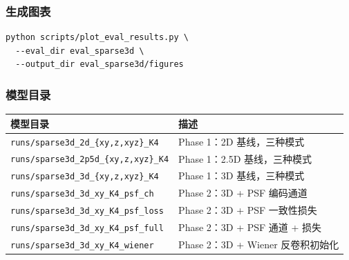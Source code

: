 \documentclass[UTF8, scheme=plain, 11pt, a4paper]{ctexart}
\begin{document}
\subsubsection*{生成图表}
\begin{verbatim}
python scripts/plot_eval_results.py \
  --eval_dir eval_sparse3d \
  --output_dir eval_sparse3d/figures
\end{verbatim}

\subsubsection*{模型目录}
\begin{table}[H]
  \small
  \centering
  \begin{tabular}{ll}
    \toprule
    模型目录 & 描述 \\
    \midrule
    \texttt{runs/sparse3d\_2d\_\{xy,z,xyz\}\_K4} & Phase 1：2D 基线，三种模式 \\
    \texttt{runs/sparse3d\_2p5d\_\{xy,z,xyz\}\_K4} & Phase 1：2.5D 基线，三种模式 \\
    \texttt{runs/sparse3d\_3d\_\{xy,z,xyz\}\_K4} & Phase 1：3D 基线，三种模式 \\
    \texttt{runs/sparse3d\_3d\_xy\_K4\_psf\_ch} & Phase 2：3D + PSF 编码通道 \\
    \texttt{runs/sparse3d\_3d\_xy\_K4\_psf\_loss} & Phase 2：3D + PSF 一致性损失 \\
    \texttt{runs/sparse3d\_3d\_xy\_K4\_psf\_full} & Phase 2：3D + PSF 通道 + 损失 \\
    \texttt{runs/sparse3d\_3d\_xy\_K4\_wiener} & Phase 2：3D + Wiener 反卷积初始化 \\
    \bottomrule
  \end{tabular}
\end{table}
\end{document}
